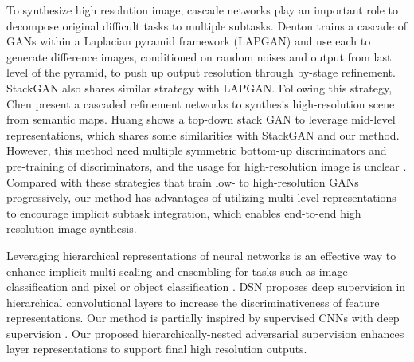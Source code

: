\documentclass[10pt,twocolumn,letterpaper]{article}
\begin{document}

To synthesize high resolution image, cascade networks play an important role to decompose original difficult tasks to multiple subtasks.
Denton \etal \cite{denton2015deep} trains a cascade of GANs within a Laplacian pyramid framework (LAPGAN) and use each to generate difference images, conditioned on random noises and output from last level of the pyramid, to push up output resolution through by-stage refinement. StackGAN also shares similar strategy with LAPGAN. Following this strategy, Chen \etal \cite{chen2017photographic} present a cascaded refinement networks to synthesis high-resolution scene from semantic maps. 
Huang \etal \cite{huang2016stacked}
shows a top-down stack GAN to leverage mid-level representations, which shares some similarities with StackGAN and our method. However, this method need multiple symmetric  bottom-up discriminators and pre-training of discriminators, and the usage for high-resolution image is unclear \cite{han2017stackgan}. Compared with these strategies that train low- to high-resolution GANs progressively, our method has advantages of utilizing multi-level representations to encourage implicit subtask integration, which enables end-to-end high resolution image synthesis.


Leveraging hierarchical representations of neural networks is an effective way to enhance implicit multi-scaling and ensembling for tasks such as image classification \cite{lee2015deeply} and pixel or object classification \cite{xie2015holistically,cai2016unified,long2015fully}. DSN \cite{lee2015deeply} proposes deep supervision in hierarchical convolutional layers to increase the discriminativeness of feature representations. 
Our method is partially inspired by supervised CNNs with deep supervision \cite{lee2015deeply,xie2015holistically}. Our proposed hierarchically-nested adversarial supervision enhances layer representations to support final high resolution outputs.   
\begin{figure}[t]
	\centering
	\caption{} \label{fig:archs}
\end{figure}
\end{document}
